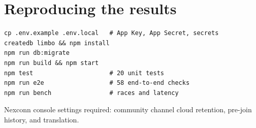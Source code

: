 \documentclass[10pt,twocolumn]{article}
\begin{document}
\appendix
\section{Reproducing the results}
\begin{small}
\begin{verbatim}
cp .env.example .env.local   # App Key, App Secret, secrets
createdb limbo && npm install
npm run db:migrate
npm run build && npm start
npm test                     # 20 unit tests
npm run e2e                  # 58 end-to-end checks
npm run bench                # races and latency
\end{verbatim}
\end{small}
Nexconn console settings required: community channel cloud retention, pre-join history, and translation.
\end{document}
